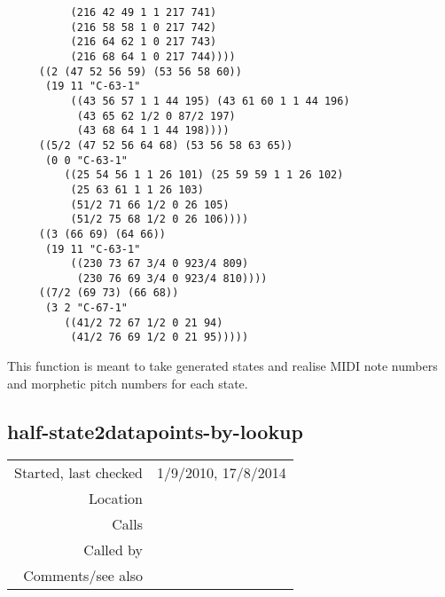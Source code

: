 \begin{verbatim}
          (216 42 49 1 1 217 741)
          (216 58 58 1 0 217 742)
          (216 64 62 1 0 217 743)
          (216 68 64 1 0 217 744))))
     ((2 (47 52 56 59) (53 56 58 60))
      (19 11 "C-63-1" 
          ((43 56 57 1 1 44 195) (43 61 60 1 1 44 196)
           (43 65 62 1/2 0 87/2 197)
           (43 68 64 1 1 44 198))))
     ((5/2 (47 52 56 64 68) (53 56 58 63 65))
      (0 0 "C-63-1"
         ((25 54 56 1 1 26 101) (25 59 59 1 1 26 102)
          (25 63 61 1 1 26 103)
          (51/2 71 66 1/2 0 26 105)
          (51/2 75 68 1/2 0 26 106))))
     ((3 (66 69) (64 66))
      (19 11 "C-63-1"
          ((230 73 67 3/4 0 923/4 809)
           (230 76 69 3/4 0 923/4 810))))
     ((7/2 (69 73) (66 68))
      (3 2 "C-67-1"
         ((41/2 72 67 1/2 0 21 94)
          (41/2 76 69 1/2 0 21 95)))))
\end{verbatim}

\noindent This function is meant to take generated
states and realise MIDI note numbers and morphetic
pitch numbers for each state.


\subsection*{half-state2datapoints-by-lookup}\label{fun:half-state2datapoints-by-lookup}

\vspace{0.3cm}
\begin{tabular}{r|p{8cm}}
Started, last checked & 1/9/2010, 17/8/2014 \\
Location & \nameref{sec:realising-states} \\
Calls & \nameref{fun:state-note2datapoint-by-lookup} \\
Called by & \nameref{fun:states2datapoints-by-lookup} \\
Comments/see also & \nameref{fun:half-state2datapoints}
\end{tabular}

